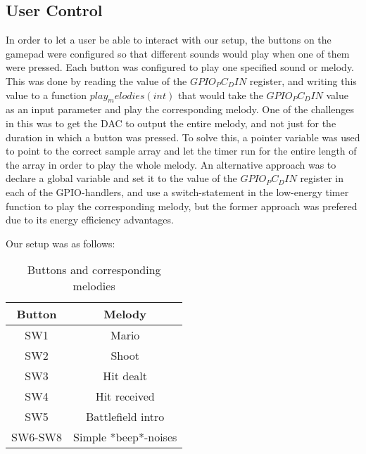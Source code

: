 \subsection{User Control}

In order to let a user be able to interact with our setup, the buttons on the gamepad were configured so that different sounds would play when one of them were pressed. Each button was configured to play one specified sound or melody. This was done by reading the value of the $GPIO_PC_DIN$ register, and writing this value to a function $play_melodies(int)$ that would take the $GPIO_PC_DIN$ value as an input parameter and play the corresponding melody. One of the challenges in this was to get the DAC to output the entire melody, and not just for the duration in which a button was pressed. To solve this, a pointer variable was used to point to the correct sample array and let the timer run for the entire length of the array in order to play the whole melody. An alternative approach was to declare a global variable and set it to the value of the $GPIO_PC_DIN$ register in each of the GPIO-handlers, and use a switch-statement in the low-energy timer function to play the corresponding melody, but the former approach was prefered due to its energy efficiency advantages.

Our setup was as follows:

\begin{table}[ht]
\caption{Buttons and corresponding melodies}
\centering
\begin{tabular}{c c}
\hline
\hline %
Button & Melody \\ [0.5ex]
\hline
SW1 & Mario \\
SW2 & Shoot \\
SW3 & Hit dealt \\
SW4 & Hit received \\
SW5 & Battlefield intro \\
SW6-SW8 & Simple *beep*-noises \\
\hline
\end{tabular}
\label{table:nonlin}
\end{table}
